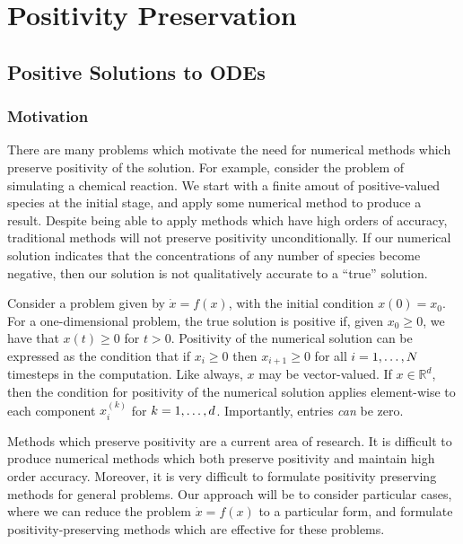 

\chapter{Positivity Preservation}
\label{cha:pos}

\section{Positive Solutions to ODEs}

\subsection{Motivation}

There are many problems which motivate the need for numerical methods which preserve positivity of the solution.
For example, consider the problem of simulating a chemical reaction.
We start with a finite amout of positive-valued species at the initial stage, and apply some numerical method to produce a result.
Despite being able to apply methods which have high orders of accuracy, traditional methods will not preserve positivity unconditionally.
If our numerical solution indicates that the concentrations of any number of species become negative, then our solution is not qualitatively accurate to a ``true'' solution.

Consider a problem given by $\dot{x} = f(x)$, with the initial condition $x(0) = x_0$.
For a one-dimensional problem, the true solution is positive if, given $x_0 \ge 0$, we have that $x(t) \ge 0$ for $t>0$.
Positivity of the numerical solution can be expressed as the condition that if $x_i \ge 0$ then $x_{i+1} \ge 0$ for all $i = 1, \mathellipsis, N$ timesteps in the computation.
Like always, $x$ may be vector-valued. If $x \in \mathds{R}^d$,
then the condition for positivity of the numerical solution applies element-wise to each component $x_i^{(k)}$ for $k = 1, \mathellipsis, d$.
Importantly, entries \textit{can} be zero. 

Methods which preserve positivity are a current area of research. It is difficult to produce numerical methods which both preserve positivity and maintain high order accuracy.
Moreover, it is very difficult to formulate positivity preserving methods for general problems.
Our approach will be to consider particular cases, where we can reduce the problem $\dot{x} = f(x)$ to a particular form,
and formulate positivity-preserving methods which are effective for these problems.

